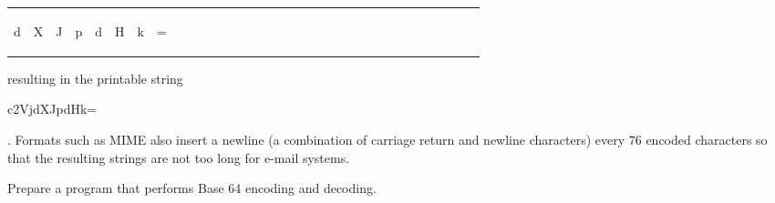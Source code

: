 \begin{center}
\begin{tabular}{cccccccc|cccccccc|cccccccc||cccccccc|cccccccc|cccccccc||cccccccc|cccccccc|cccccccc}
  \multicolumn{6}{c}{\begin{code}d\end{code}} &
  \multicolumn{6}{c}{\begin{code}X\end{code}} &
  \multicolumn{6}{c}{\begin{code}J\end{code}} &
  \multicolumn{6}{c||}{\begin{code}p\end{code}} &
  \multicolumn{6}{c}{\begin{code}d\end{code}} &
  \multicolumn{6}{c}{\begin{code}H\end{code}} &
  \multicolumn{6}{c}{\begin{code}k\end{code}} &
  \multicolumn{6}{c}{\begin{code}=\end{code}}
\end{tabular}\end{center}

\noindent
resulting in the printable string \begin{code}c2VjdXJpdHk=\end{code}.
Formats such as MIME also insert a newline (a combination of carriage return and newline characters)
every 76 encoded characters so that the resulting strings are not too long for
e-mail systems.


\begin{exercise}
Prepare a program that performs Base 64 encoding and decoding.
\end{exercise}




